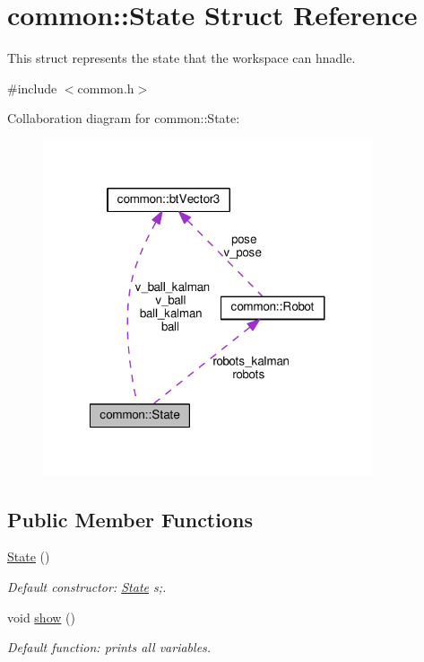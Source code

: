\hypertarget{structcommon_1_1State}{\section{common\-:\-:State Struct Reference}
\label{structcommon_1_1State}
}


This struct represents the state that the workspace can hnadle.  




{\ttfamily \#include $<$common.\-h$>$}



Collaboration diagram for common\-:\-:State\-:
\nopagebreak
\begin{figure}[H]
\begin{center}
\leavevmode
\includegraphics[width=275pt]{structcommon_1_1State__coll__graph}
\end{center}
\end{figure}
\subsection*{Public Member Functions}
\begin{DoxyCompactItemize}
\item 
\hypertarget{structcommon_1_1State_ac8dcfb15646bb310c85161de2900c8c6}{\hyperlink{structcommon_1_1State_ac8dcfb15646bb310c85161de2900c8c6}{State} ()}\label{structcommon_1_1State_ac8dcfb15646bb310c85161de2900c8c6}

\begin{DoxyCompactList}\small\item\em Default constructor\-: \hyperlink{structcommon_1_1State}{State} s;. \end{DoxyCompactList}\item 
\hypertarget{structcommon_1_1State_af0a474961bf0f3afe274ce27da0f28a3}{void \hyperlink{structcommon_1_1State_af0a474961bf0f3afe274ce27da0f28a3}{show} ()}\label{structcommon_1_1State_af0a474961bf0f3afe274ce27da0f28a3}

\begin{DoxyCompactList}\small\item\em Default function\-: prints all variables. \end{DoxyCompactList}\end{DoxyCompactItemize}
